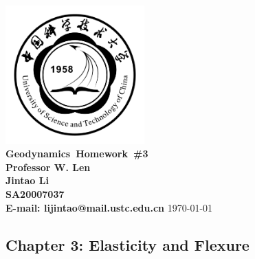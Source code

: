 \documentclass{article}
\makeatletter
\newcommand{\hmwkTitle}{Homework\ \#3}
\newcommand{\hmwkDueDate}{\today}
\newcommand{\hmwkClass}{Geodynamics}
\newcommand{\hmwkClassInstructor}{Professor W. Len}
\newcommand{\hmwkAuthorName}{\textbf{Jintao Li}}
\newcommand{\hmwkAuthorID}{\textbf{SA20007037}}
\newcommand{\hmwkAuthoremail}{\textbf{E-mail: lijintao@mail.ustc.edu.cn}}
\makeatother
\begin{document}
\begin{titlepage}
\begin{center}

\textcolor{ustcblue}{\includegraphics[width=0.4\textwidth]{../../inversion/ustc_logo_fig.pdf} \\ [1cm]}
{ \Huge \bfseries \hmwkClass\ \hmwkTitle}\\[1cm]

\large \textbf{\hmwkClassInstructor} \\ [5cm]

\large \hmwkAuthorName \\ [0.25cm]
\large \hmwkAuthorID \\ [0.25cm]
\large \hmwkAuthoremail
\vfill
{\large \hmwkDueDate}

\end{center}
\end{titlepage}

\begin{center}
\section{Chapter 3: Elasticity and Flexure}
\end{center}
\end{document}
